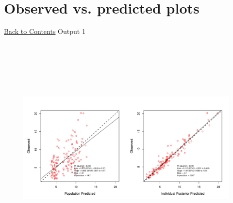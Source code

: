 \documentclass{article}
\begin{document}
        \section{Observed vs. predicted plots}
        \hyperlink{tableofcontents}{Back to Contents} \newline
        \newline 
Output 1 
\begin{figure}[H] 
              \includegraphics[height=4.5in,width=8in]{op1.pdf} 
              \end{figure} 
\end{document}
